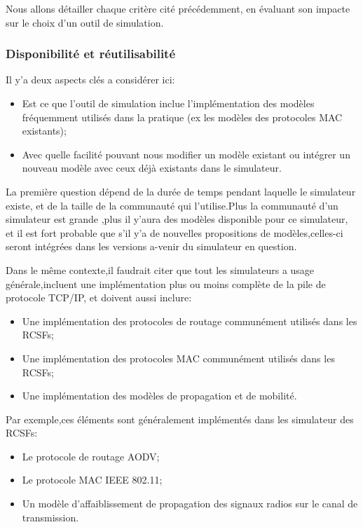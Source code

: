 Nous allons détailler chaque critère cité précédemment, en évaluant son impacte sur le choix d'un outil de simulation.

\subsubsection{Disponibilité et réutilisabilité}
Il y'a deux aspects clés a considérer ici:
\begin{itemize}
\item Est ce que l'outil de simulation inclue l'implémentation des modèles fréquemment utilisés dans la pratique (ex les modèles des protocoles MAC existants);
\item Avec quelle facilité pouvant nous modifier un modèle existant ou intégrer un nouveau modèle avec ceux déjà existants dans le simulateur.
\end{itemize}

La première question dépend de la durée de temps pendant laquelle le simulateur existe, et de la taille de la communauté qui l'utilise.Plus la communauté d'un simulateur est grande ,plus il y'aura des modèles disponible pour ce simulateur, et il est fort probable que s'il y'a de nouvelles propositions de modèles,celles-ci seront intégrées dans les versions a-venir du simulateur en question.

Dans le même contexte,il faudrait citer que tout les simulateurs a usage générale,incluent une implémentation plus ou moins complète de la pile de protocole TCP/IP, et doivent aussi inclure:
\begin{itemize}
\item Une implémentation des protocoles de routage communément utilisés dans les RCSFs;
\item Une implémentation des protocoles MAC communément utilisés  dans les RCSFs;
\item Une implémentation des modèles de propagation et de mobilité.
\end{itemize}

Par exemple,ces éléments sont généralement implémentés dans les simulateur des RCSFs:
\begin{itemize}
\item Le protocole de routage AODV;
\item Le protocole MAC IEEE 802.11;
\item Un modèle d'affaiblissement de propagation des signaux radios sur le canal de transmission.

\end{itemize}


